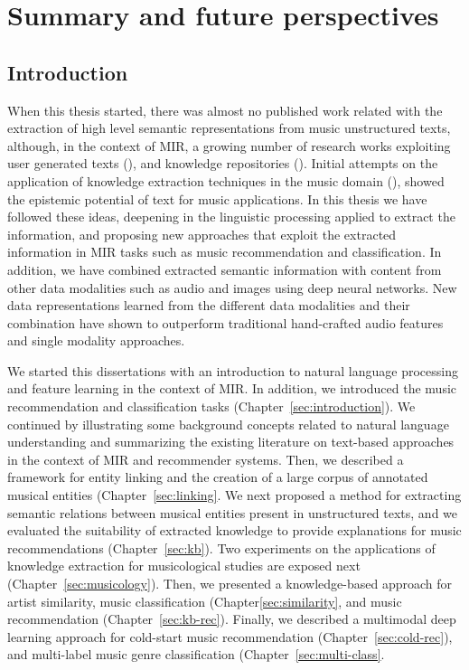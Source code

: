 
\chapter{Summary and future perspectives}
\label{sec:conclusion}

\section{Introduction}

When this thesis started, there was almost no published work related with the extraction of high level semantic representations from music unstructured texts, although, in the context of MIR, a growing number of research works exploiting user generated texts (\cite{Celma2006,lamere2008social,Whitman2002,Knees2013}), and knowledge repositories (\cite{sordo1788,Celma:ISWC06,dbrec1,Ostuni2013}). Initial attempts on the application of knowledge extraction techniques in the music domain (\cite{Tata2010,Knees2011,Sordo2012}), showed the epistemic potential of text for music applications. In this thesis we have followed these ideas, deepening in the linguistic processing applied to extract the information, and proposing new approaches that exploit the extracted information in MIR tasks such as music recommendation and classification. In addition, we have combined extracted semantic information with content from other data modalities such as audio and images using deep neural networks. New data representations learned from the different data modalities and their combination have shown to outperform traditional hand-crafted audio features and single modality approaches.

We started this dissertations with an introduction to natural language processing and feature learning in the context of MIR. In addition, we introduced the music recommendation and classification tasks (Chapter~\ref{sec:introduction}). We continued by illustrating some background concepts related to natural language understanding and summarizing the existing literature on text-based approaches in the context of MIR and recommender systems. Then, we described a framework for entity linking and the creation of a large corpus of annotated musical entities (Chapter~\ref{sec:linking}. We next proposed a method for extracting semantic relations between musical entities present in unstructured texts, and we evaluated the suitability of extracted knowledge to provide explanations for music recommendations (Chapter~\ref{sec:kb}). Two experiments on the applications of knowledge extraction for musicological studies are exposed next (Chapter~\ref{sec:musicology}). Then, we presented a knowledge-based approach for artist similarity, music classification (Chapter\ref{sec:similarity}, and music recommendation (Chapter~\ref{sec:kb-rec}). Finally, we described a multimodal deep learning approach for cold-start music recommendation (Chapter~\ref{sec:cold-rec}), and multi-label music genre classification (Chapter~\ref{sec:multi-class}.

